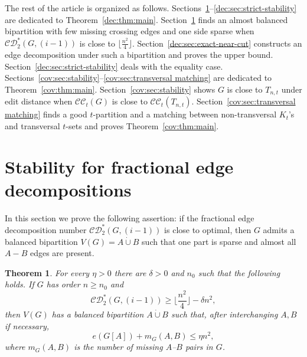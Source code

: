 \documentclass[11pt]{article}
\numberwithin{equation}{section}
\newtheorem{theorem}{Theorem}[section]
\theoremstyle{remark}
\newcommand{\dotcupunion}{\mathbin{\dot\cup}}
\newcommand{\CC}{\mathcal{CC}}
\newcommand{\CDstar}{\mathcal{CD}^{*}}
\begin{document}
The rest of the article is organized as follows. Sections~\ref{dec:sec:fractional-stability}--\ref{dec:sec:strict-stability}
are dedicated to Theorem~\ref{dec:thm:main}. Section~\ref{dec:sec:fractional-stability} finds an almost balanced bipartition
with few missing crossing edges and one side sparse when \(\CDstar_2(G,(i-1))\) is close to \(\lfloor \frac{n^2}{4}\rfloor\).
Section~\ref{dec:sec:exact-near-cut} constructs an edge decomposition under such a bipartition and proves the upper bound.
Section~\ref{dec:sec:strict-stability} deals with the equality case.
Sections~\ref{cov:sec:stability}--\ref{cov:sec:transversal matching} are dedicated to Theorem~\ref{cov:thm:main}.
Section~\ref{cov:sec:stability} shows \(G\) is close to \(T_{n,t}\) under edit distance when \(\CC_t(G)\) is close to \(\CC_t(T_{n,t})\).
Section~\ref{cov:sec:transversal matching} finds a good \(t\)-partition and a matching between
non-transversal \(K_t\)'s and transversal \(t\)-sets and proves Theorem~\ref{cov:thm:main}.

\section{Stability for fractional edge decompositions}\label{dec:sec:fractional-stability}

In this section we prove the following assertion: if the fractional edge decomposition number \(\CDstar_2(G,(i-1))\) is close to optimal,
then \(G\) admits a balanced bipartition \(V(G)=A\dotcupunion B\) such that one part is sparse and almost all \(A-B\) edges are present.

\begin{theorem}
  \label{dec:thm:fractional-stability}
For every \(\eta>0\) there are \(\delta>0\) and \(n_0\) such that the following holds. If \(G\) has order \(n\ge n_0\) and
\begin{equation*}
  \CDstar_2(G,(i-1))\ge \lfloor \frac{n^2}{4}\rfloor-\delta n^2,
\end{equation*}
then \(V(G)\) has a balanced bipartition \(A\dotcupunion B\) such that, after interchanging \(A,B\) if necessary,
\begin{equation}\label{dec:eq:2.1}
  e(G[A])+m_G(A,B)\le \eta n^2,
\end{equation}
where \(m_G(A,B)\) is the number of missing \(A\)--\(B\) pairs in \(G\).
\end{theorem}
\end{document}
